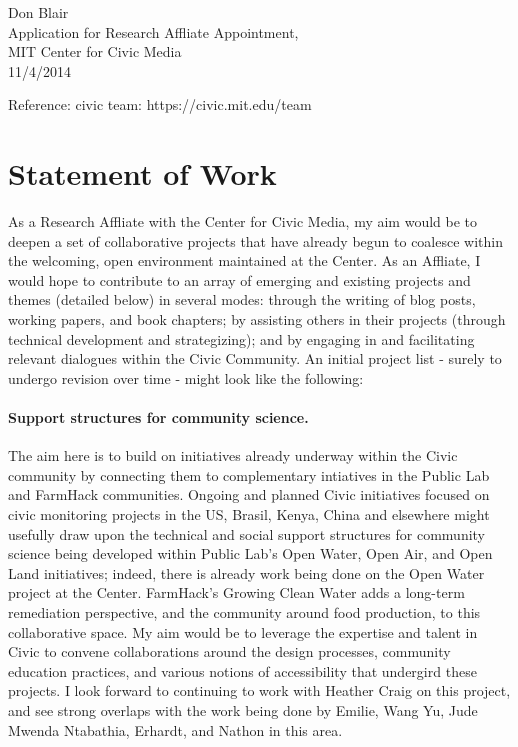 \documentclass[12pt]{article}
\begin{document}
\setlength\parindent{0pt}

Don Blair\\
Application for Research Affliate Appointment,\\
MIT Center for Civic Media \\
11/4/2014

Reference:  civic team: https://civic.mit.edu/team

\section*{Statement of Work}

As a Research Affliate with the Center for Civic Media, my aim would be to deepen a set of collaborative projects that have already begun to coalesce within the welcoming, open environment maintained at the Center. As an Affliate, I would hope to contribute to an array of emerging and existing projects and themes (detailed below) in several modes: through the writing of blog posts, working papers, and book chapters; by assisting others in their projects (through technical development and strategizing); and by engaging in and facilitating relevant dialogues within the Civic Community.  An initial project list - surely to undergo revision over time - might look like the following:

\paragraph{Support structures for community science.} The aim here is to build on initiatives already underway within the Civic community by connecting them to complementary intiatives in the Public Lab and FarmHack communities.  Ongoing and planned Civic initiatives focused on civic monitoring projects in the US, Brasil, Kenya, China and elsewhere might usefully draw upon the technical and social support structures for community science being developed within Public Lab's Open Water, Open Air, and Open Land initiatives; indeed, there is already work being done on the Open Water project at the Center.  FarmHack's Growing Clean Water adds a long-term remediation perspective, and the community around food production, to this collaborative space.  My aim would be to leverage the expertise and talent in Civic to convene collaborations around the design processes, community education practices, and various notions of accessibility that undergird these projects.  I look forward to continuing to work with Heather Craig on this project, and see strong overlaps with the work being done by Emilie, Wang Yu, Jude Mwenda Ntabathia, Erhardt, and Nathon in this area.
\end{document}
